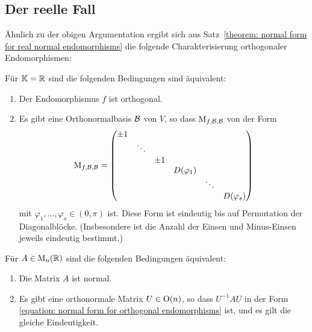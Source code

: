 \subsection{Der reelle Fall}

Ähnlich zu der obigen Argumentation ergibt sich aus Satz~\ref{theorem: normal form for real normal endomorphisms} die folgende Charakterisierung orthogonaler Endomorphismen:

\begin{theorem}
  Für $\mathbb{K} = \mathbb{R}$ sind die folgenden Bedingungen sind äquivalent:
  \begin{enumerate}
    \item
      Der Endomorphismus $f$ ist orthogonal.
    \item
      Es gibt eine Orthonormalbasis $\mathcal{B}$ von $V$, so dass $\operatorname{M}_{f, \mathcal{B}, \mathcal{B}}$ von der Form
      \begin{equation}
      \label{equation: normal form for orthogonal endomorphisms}
          \operatorname{M}_{f, \mathcal{B}, \mathcal{B}}
        = \begin{pmatrix}
            \pm 1 &         &       &               &         &               \\
                  & \ddots  &       &               &         &               \\
                  &         & \pm 1 &               &         &               \\
                  &         &       & D(\varphi_1)  &         &               \\
                  &         &       &               & \ddots  &               \\
                  &         &       &               &         & D(\varphi_s)
          \end{pmatrix}
      \end{equation}
      mit $\varphi_1, \dotsc, \varphi_s \in (0, \pi)$ ist.
      Diese Form ist eindeutig bis auf Permutation der Diagonalblöcke.
      \textup(Insbesondere ist die Anzahl der Einsen und Minus-Einsen jeweils eindeutig bestimmt.\textup)
  \end{enumerate}
\end{theorem}

\begin{corollary}
  Für $A \in \operatorname{M}_{n}(\mathbb{R})$ sind die folgenden Bedingungen äquivalent:
  \begin{enumerate}
    \item
      Die Matrix $A$ ist normal.
    \item
      Es gibt eine orthonormale Matrix $U \in \operatorname{O}(n)$, so dass $U^{-1} A U$ in der Form \eqref{equation: normal form for orthogonal endomorphisms} ist, und es gilt die gleiche Eindeutigkeit.
  \end{enumerate}
\end{corollary}





